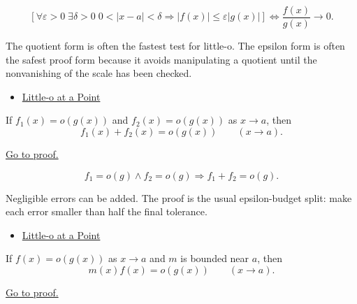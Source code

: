 \begin{remark*}
\[
\left[\forall\varepsilon>0\;\exists\delta>0\;
0<|x-a|<\delta\Rightarrow |f(x)|\leq\varepsilon |g(x)|\right]
\Longleftrightarrow
\frac{f(x)}{g(x)}\to 0.
\]
\end{remark*}

\begin{remark*}[Interpretation]
The quotient form is often the fastest test for little-o. The epsilon form is
often the safest proof form because it avoids manipulating a quotient until the
nonvanishing of the scale has been checked.
\end{remark*}

\begin{dependencies}
\begin{itemize}
  \item \hyperref[def:little-o-at-a-point]{Little-o at a Point}
\end{itemize}
\end{dependencies}

\begin{proposition}
\label{prop:little-o-sum-rule}
If $f_1(x)=o(g(x))$ and $f_2(x)=o(g(x))$ as $x\to a$, then
\[
  f_1(x)+f_2(x)=o(g(x))\qquad (x\to a).
\]

\smallskip\noindent
\hyperref[prf:little-o-sum-rule]{Go to proof.}
\end{proposition}

\begin{remark*}
\[
f_1=o(g)\land f_2=o(g)
\Longrightarrow
f_1+f_2=o(g).
\]
\end{remark*}

\begin{remark*}[Interpretation]
Negligible errors can be added. The proof is the usual epsilon-budget split:
make each error smaller than half the final tolerance.
\end{remark*}

\begin{dependencies}
\begin{itemize}
  \item \hyperref[def:little-o-at-a-point]{Little-o at a Point}
\end{itemize}
\end{dependencies}

\begin{proposition}
\label{prop:little-o-bounded-factor-rule}
If $f(x)=o(g(x))$ as $x\to a$ and $m$ is bounded near $a$, then
\[
  m(x)f(x)=o(g(x))\qquad (x\to a).
\]

\smallskip\noindent
\hyperref[prf:little-o-bounded-factor-rule]{Go to proof.}
\end{proposition}

